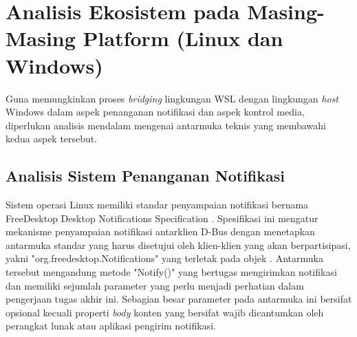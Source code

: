 \section{Analisis Ekosistem pada Masing-Masing Platform (Linux dan Windows)}

Guna memungkinkan proses \textit{bridging} lingkungan WSL dengan lingkungan \textit{host} Windows dalam aspek penanganan notifikasi dan aspek kontrol media, diperlukan analisis mendalam mengenai antarmuka teknis yang membawahi kedua aspek tersebut.

\subsection{Analisis Sistem Penanganan Notifikasi}

Sistem operasi Linux memiliki standar penyampaian notifikasi bernama FreeDesktop Desktop Notifications Specification \cite{xdg-desktop-notifications-specification}. Spesifikasi ini mengatur mekanisme penyampaian notifikasi antarklien D-Bus dengan menetapkan antarmuka standar yang harus disetujui oleh klien-klien yang akan berpartisipasi, yakni "org.freedesktop.Notifications" yang terletak pada objek . Antarmuka tersebut mengandung metode "Notify()" yang bertugas mengirimkan notifikasi dan memiliki sejumlah parameter yang perlu menjadi perhatian dalam pengerjaan tugas akhir ini. Sebagian besar parameter pada antarmuka ini bersifat opsional kecuali properti \textit{body} konten yang bersifat wajib dicantumkan oleh perangkat lunak atau aplikasi pengirim notifikasi.
